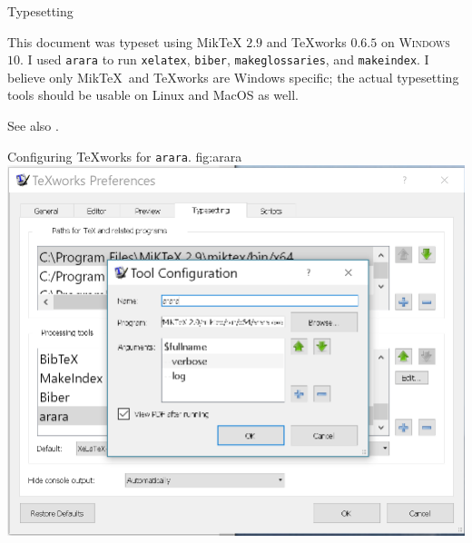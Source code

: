 \begin{plSection}{Typesetting}

This document was typeset using Mik\TeX{} $2.9$ \cite{Schenk:2017:Miktex} 
and {\TeX}works $0.6.5$ \cite{KewLoffler:2017:Texworks} 
on \textsc{Windows} $10$. 
I used \texttt{arara} \cite{CeredaEtAl:2021:Arara} 
to run \texttt{xelatex}, \texttt{biber}, \texttt{makeglossaries},  and
\texttt{makeindex}.
I believe only Mik\TeX\  and {\TeX}works are Windows specific; 
the actual typesetting tools should be usable on Linux and MacOS as well.

See also \cite{Talbot:2012:LatexNovices,Talbot:2013:LatexPhD}.

\begin{plScreen}
{Configuring {\TeX}works for \texttt{arara}.}
{fig:arara}
\centering
\includegraphics[scale=0.75]{../figs/arara.png}
\end{plScreen}
\vfill
\end{plSection}%
